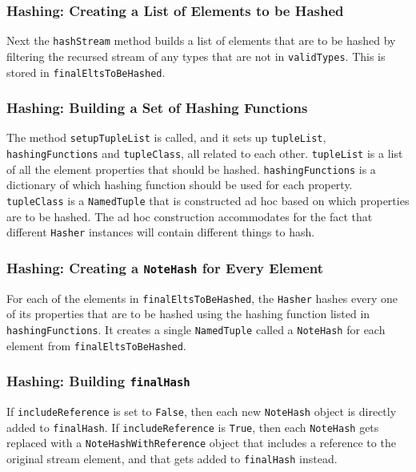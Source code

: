         \subsubsection{Hashing: Creating a List of Elements to be Hashed}
        Next the \texttt{hashStream} method builds a list of elements that are to be hashed by filtering the recursed stream of any types that are not in \texttt{validTypes}. This is stored in \texttt{finalEltsToBeHashed}.
        
        \subsubsection{Hashing: Building a Set of Hashing Functions}
        The method \texttt{setupTupleList} is called, and it sets up \texttt{tupleList}, \texttt{hashingFunctions} and \texttt{tupleClass}, all related to each other. \texttt{tupleList} is a list of all the element properties that should be hashed. \texttt{hashingFunctions} is a dictionary of which hashing function should be used for each property. \texttt{tupleClass} is a \texttt{NamedTuple} that is constructed ad hoc based on which properties are to be hashed. The ad hoc construction accommodates for the fact that different \texttt{Hasher} instances will contain different things to hash. 
        
        \subsubsection{Hashing: Creating a \texttt{NoteHash} for Every Element}
        For each of the elements in \texttt{finalEltsToBeHashed}, the \texttt{Hasher} hashes every one of its properties that are to be hashed using the hashing function listed in \texttt{hashingFunctions}. It creates a single \texttt{NamedTuple} called a \texttt{NoteHash} for each element from \texttt{finalEltsToBeHashed}.
        
        \subsubsection{Hashing: Building \texttt{finalHash}}
        If \texttt{includeReference} is set to \texttt{False}, then each new \texttt{NoteHash} object is directly added to \texttt{finalHash}. If \texttt{includeReference} is \texttt{True}, then each \texttt{NoteHash} gets replaced with a \texttt{NoteHashWithReference} object that includes a reference to the original stream element, and that gets added to \texttt{finalHash} instead.
    
